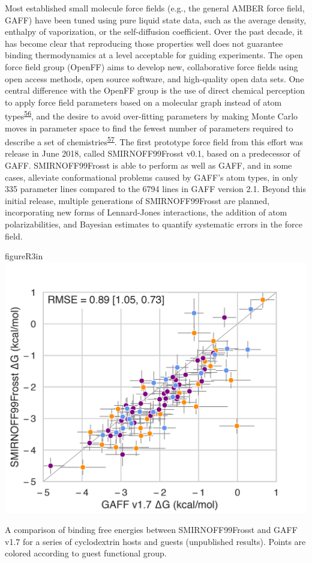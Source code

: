 \documentclass[11pt,notitlepage]{article}
\begin{document}
Most established small molecule force fields (e.g., the general AMBER
force field, GAFF) have been tuned using pure liquid state data, such as
the average density, enthalpy of vaporization, or the self-diffusion
coefficient. Over the past decade, it has become clear that reproducing
those properties well does not guarantee binding thermodynamics at a
level acceptable for guiding experiments. The open force field group
(OpenFF) aims to develop new, collaborative force fields using open
access methods, open source software, and high-quality open data sets.
One central difference with the OpenFF group is the use of direct
chemical perception to apply force field parameters based on a molecular
graph instead of atom
types\textsuperscript{\protect\hyperlink{ref-HlBr7NrU}{56}}, and the
desire to avoid over-fitting parameters by making Monte Carlo moves in
parameter space to find the fewest number of parameters required to
describe a set of
chemistries\textsuperscript{\protect\hyperlink{ref-13lTSBgHy}{57}}. The
first prototype force field from this effort was release in June 2018,
called SMIRNOFF99Frosst v0.1, based on a predecessor of GAFF.
SMIRNOFF99Frosst is able to perform as well as GAFF, and in some cases,
alleviate conformational problems caused by GAFF's atom types, in only
335 parameter lines compared to the 6794 lines in GAFF version 2.1.
Beyond this initial release, multiple generations of SMIRNOFF99Frosst
are planned, incorporating new forms of Lennard-Jones interactions, the
addition of atom polarizabilities, and Bayesian estimates to quantify
systematic errors in the force field.


\begin{wrapfloat}{figure}{R}{3in}
\centering
\includegraphics{content/images/SMIRNOFF-vs-GAFF-deltaG.png}
\caption{A comparison of binding free energies between SMIRNOFF99Frosst
and GAFF v1.7 for a series of cyclodextrin hosts and guests (unpublished
results). Points are colored according to guest functional group.}
\label{fig:smirnoff}
\end{wrapfloat}
\end{document}
